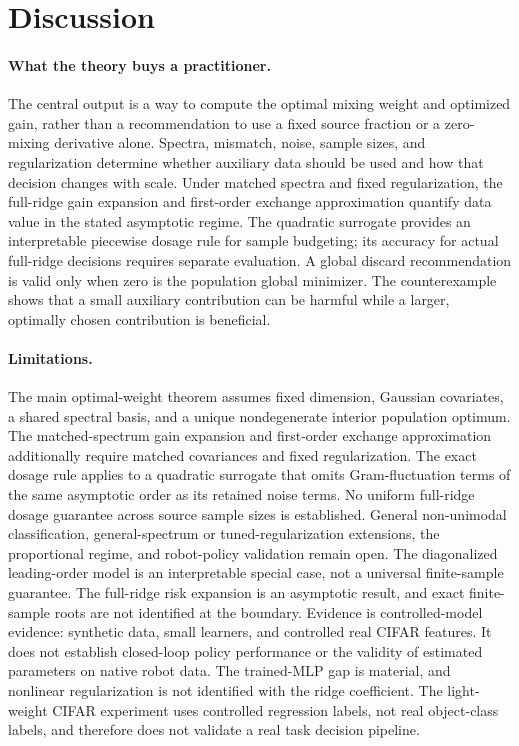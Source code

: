 \section{Discussion}
\label{sec:discussion}

\paragraph{What the theory buys a practitioner.}
The central output is a way to compute the optimal mixing weight and optimized gain, rather than a recommendation to use a fixed source fraction or a zero-mixing derivative alone. Spectra, mismatch, noise, sample sizes, and regularization determine whether auxiliary data should be used and how that decision changes with scale. Under matched spectra and fixed regularization, the full-ridge gain expansion and first-order exchange approximation quantify data value in the stated asymptotic regime. The quadratic surrogate provides an interpretable piecewise dosage rule for sample budgeting; its accuracy for actual full-ridge decisions requires separate evaluation.
A global discard recommendation is valid only when zero is the population global minimizer. The counterexample shows that a small auxiliary contribution can be harmful while a larger, optimally chosen contribution is beneficial.

\paragraph{Limitations.}
The main optimal-weight theorem assumes fixed dimension, Gaussian covariates, a shared spectral basis, and a unique nondegenerate interior population optimum. The matched-spectrum gain expansion and first-order exchange approximation additionally require matched covariances and fixed regularization. The exact dosage rule applies to a quadratic surrogate that omits Gram-fluctuation terms of the same asymptotic order as its retained noise terms. No uniform full-ridge dosage guarantee across source sample sizes is established. General non-unimodal classification, general-spectrum or tuned-regularization extensions, the proportional regime, and robot-policy validation remain open.
The diagonalized leading-order model is an interpretable special case, not a universal finite-sample guarantee. The full-ridge risk expansion is an asymptotic result, and exact finite-sample roots are not identified at the boundary. Evidence is controlled-model evidence: synthetic data, small learners, and controlled real CIFAR features. It does not establish closed-loop policy performance or the validity of estimated parameters on native robot data.
The trained-MLP gap is material, and nonlinear regularization is not identified with the ridge coefficient. The light-weight CIFAR experiment uses controlled regression labels, not real object-class labels, and therefore does not validate a real task decision pipeline.

